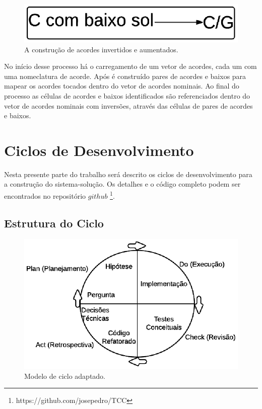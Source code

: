 \begin{figure}[h] 
  \centering
    \includegraphics[keepaspectratio=true, scale=0.55]{figuras/procedimento_10}
    \caption{A construção de acordes invertidos e aumentados.}
    \label{fig:procedimento_10}
\end{figure}

No início desse processo há o carregamento de um vetor de acordes, cada um com uma nomeclatura de acorde. Após é construído pares de acordes e baixos para mapear os acordes tocados dentro do vetor de acordes nominais. Ao final do processo as células de acordes e baixos identificados são referenciados dentro do vetor de acordes nominais com inversões, através das células de pares de acordes e baixos.



\section {Ciclos de Desenvolvimento}
 
Nesta presente parte do trabalho será descrito os ciclos de desenvolvimento para a construção do sistema-solução. Os detalhes e o código completo podem ser encontrados no repositório $github$ \footnote{https://github.com/josepedro/TCC}.

\subsection{Estrutura do Ciclo}

\begin{figure}[h] 
  \centering
    \includegraphics[keepaspectratio=true, scale=0.85]{figuras/ciclo_desenvolvimento}
    \caption{Modelo de ciclo adaptado.}
\end{figure}

